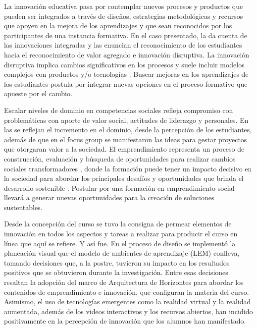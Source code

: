 \documentclass[spanish]{textolivre}
\begin{document}
La innovación educativa pasa por contemplar nuevos procesos y productos que pueden ser integrados a través de diseños, estrategias metodológicas y recursos que apoyen en la mejora de los aprendizajes y que sean reconocidos por los participantes de una instancia formativa. En el caso presentado, la  da cuenta de las innovaciones integradas y las  enuncian el reconocimiento de los estudiantes hacia el reconocimiento de valor agregado e innovación disruptiva. La innovación disruptiva implica cambios significativos en los procesos y suele incluir modelos complejos con productos y/o tecnologías \cite{garcia-gonzalez2019}. Buscar mejoras en los aprendizajes de los estudiantes postula por integrar nuevas opciones en el proceso formativo que apueste por el cambio.

Escalar niveles de dominio en competencias sociales refleja compromiso con problemáticas con aporte de valor social, actitudes de liderazgo y personales. En las  se reflejan el incremento en el dominio, desde la percepción de los estudiantes, además de que en el focus group se manifestaron las ideas para gestar proyectos que otorgaran valor a la sociedad. El emprendimiento representa un proceso de construcción, evaluación y búsqueda de oportunidades para realizar cambios sociales transformadores \cite{utomo2019}, donde la formación puede tener un impacto decisivo en la sociedad para abordar los principales desafíos y oportunidades que brinda el desarrollo sostenible \cite{sanchez-hernandez2019}. Postular por una formación en emprendimiento social llevará a generar nuevas oportunidades para la creación de soluciones sustentables.

Desde la concepción del curso se tuvo la consigna de permear elementos de innovación en todos los aspectos y tareas a realizar para producir el curso en línea que aquí se refiere. Y así fue. En el proceso de diseño se implementó la planeación visual que el modelo de ambientes de aprendizaje (LEM) conlleva, tomando decisiones que, a la postre, tuvieron su impacto en los resultados positivos que se obtuvieron durante la investigación. Entre esas decisiones resaltan la adopción del marco de Arquitectura de Horizontes para abordar los contenidos de emprendimiento e innovación, que configuran la materia del curso. Asimismo, el uso de tecnologías emergentes como la realidad virtual y la realidad aumentada, además de los videos interactivos y los recursos abiertos, han incidido positivamente en la percepción de innovación que los alumnos han manifestado.
\end{document}
